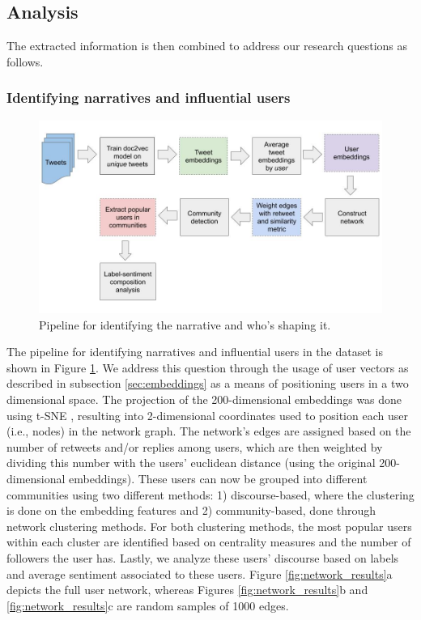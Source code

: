 \documentclass{article}
\begin{document}
\subsection{Analysis}

The extracted information is then combined to address our research questions as follows.

\subsubsection{Identifying narratives and influential users}

\begin{figure}
    \includegraphics[width=\linewidth, trim=0 50 0 75]{../figures/figures_rq2_pipeline.jpg}
  \caption{Pipeline for identifying the narrative and who's shaping it.}
  \label{fig:rq2pipeline}
\end{figure}

The pipeline for identifying narratives and influential users in the dataset is shown in Figure
\ref{fig:rq2pipeline}. We address this question through the usage of user vectors as described in
subsection \ref{sec:embeddings} as a means of positioning users in a two dimensional space. The
projection of the 200-dimensional embeddings was done using t-SNE \cite{VanDerMaaten2008}, resulting
into 2-dimensional coordinates used to position each user (i.e., nodes) in the network graph. The
network's edges are assigned based on the number of retweets and/or replies among users, which are
then weighted by dividing this number with the users' euclidean distance (using the original
200-dimensional embeddings). These users can now be grouped into different communities using two
different methods: 1) discourse-based, where the clustering is done on the embedding features and 2)
community-based, done through network clustering methods. For both clustering methods, the most
popular users within each cluster are identified based on centrality measures and the number of
followers the user has. Lastly, we analyze these users' discourse based on labels and average
sentiment associated to these users. Figure \ref{fig:network_results}a depicts the full user
network, whereas Figures \ref{fig:network_results}b and \ref{fig:network_results}c are random
samples of 1000 edges.
\end{document}
